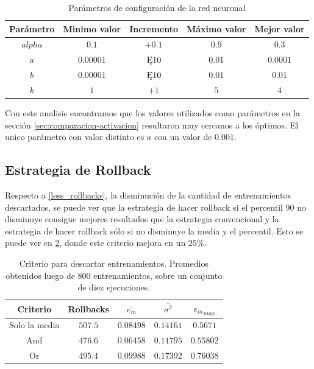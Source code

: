 \documentclass[a4paper,10pt]{article}
\begin{document}
        \begin{table}[H]
            \begin{tabular}{|c|c|c|c|c|}
                \hline
                Parámetro & Minimo valor & Incremento & Máximo valor & Mejor valor \\ \hline
                $alpha$ & $0.1$ & $+ 0.1$ & $0.9$ & $0.3$ \\ \hline
                $a$ & $0.00001$ & $\Cross 10$ & $0.01$ & $0.0001$ \\ \hline
                $b$ & $0.00001$ & $\Cross 10$ & $0.01$ & $0.01$ \\ \hline
                $k$ & $1$ & $+ 1$ & $5$ & $4$ \\ \hline
            \end{tabular}
            \caption{Parámetros de configuración de la red neuronal}
            \label{tabla_configuracion}
        \end{table}

        Con este analisis encontramos que los valores utilizados como parámetros
        en la sección \ref{sec:comparacion-activacion} resultaron muy cercanos a
        los óptimos.
        El unico parámetro con valor distinto es $a$ con un valor de $0.001$.

    \subsection{Estrategia de Rollback}

        Respecto a \ref{less_rollbacks}, la disminución de la cantidad de entrenamientos descartados, se puede ver que la estrategia de hacer rollback si el percentil 90 no disminuye consigue mejores resultados que la estrategia convencional y la estrategia de hacer rollback sólo si no disminuye la media y el percentil. Esto se puede ver en \ref{tabla_rollbacks}, donde este criterio mejora en un $25\%$.

    \begin{table}[H]
        \begin{tabular}{|c|c|c|c|c|}
        \hline
        Criterio & Rollbacks & $\overline{e_m}$ & $\overline{\sigma^2}$ & ${e_m}_{max} $ \\ \hline
        Solo la media & $507.5$ & $0.08498$ & $0.14161$ & $0.5671$ \\ \hline
        And & $476.6$ & $0.06458$ & $0.11795$ & $0.55802$ \\ \hline
        Or & $495.4$ & $0.09988$ & $0.17392$ & $0.76038$ \\ \hline
        \end{tabular}
        \caption{Criterio para descartar entrenamientos. Promedios obtenidos luego de 800 entrenamientos, sobre un conjunto de diez ejecuciones.}
        \label{tabla_rollbacks}
    \end{table}
\end{document}
